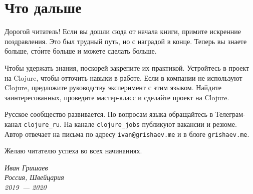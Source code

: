 \chapter{Что дальше}

Дорогой читатель! Если вы дошли сюда от начала книги, примите искренние
поздравления. Это был трудный путь, но с наградой в конце. Теперь вы знаете
больше, ст\'{о}ите больше и можете сделать больше.

Чтобы удержать знания, поскорей закрепите их практикой. Устройтесь в проект на
Clojure, чтобы отточить навыки в работе. Если в компании не используют Clojure,
предложите руководству эксперимент с этим языком. Найдите заинтересованных,
проведите мастер-класс и сделайте проект на Clojure.

Русское сообщество развивается. По вопросам языка обращайтесь в Телеграм-канал
\verb|clojure_ru|. На канале \verb|clojure_jobs| публикуют вакансии и
резюме. Автор отвечает на письма по адресу \verb|ivan@grishaev.me| и в блоге
\verb|grishaev.me|.

Желаю читателю успеха во всех начинаниях.

\vspace{1em}

\noindent
\textit{Иван Гришаев\\Россия, Швейцария\\2019~--- 2020}
